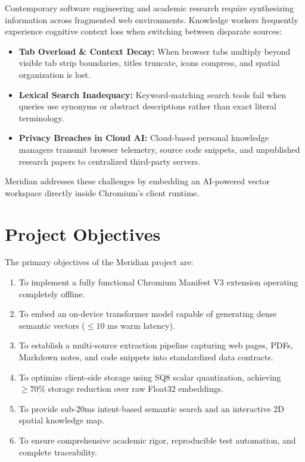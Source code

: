 \documentclass{tietreport}
\begin{document}
Contemporary software engineering and academic research require synthesizing information across fragmented web environments. Knowledge workers frequently experience cognitive context loss when switching between disparate sources:
\begin{itemize}
    \item \textbf{Tab Overload \& Context Decay:} When browser tabs multiply beyond visible tab strip boundaries, titles truncate, icons compress, and spatial organization is lost.
    \item \textbf{Lexical Search Inadequacy:} Keyword-matching search tools fail when queries use synonyms or abstract descriptions rather than exact literal terminology.
    \item \textbf{Privacy Breaches in Cloud AI:} Cloud-based personal knowledge managers transmit browser telemetry, source code snippets, and unpublished research papers to centralized third-party servers.
\end{itemize}

Meridian addresses these challenges by embedding an AI-powered vector workspace directly inside Chromium's client runtime.

\section{Project Objectives}

The primary objectives of the Meridian project are:
\begin{enumerate}
    \item To implement a fully functional Chromium Manifest V3 extension operating completely offline.
    \item To embed an on-device transformer model capable of generating dense semantic vectors ($\le 10\text{ ms}$ warm latency).
    \item To establish a multi-source extraction pipeline capturing web pages, PDFs, Markdown notes, and code snippets into standardized data contracts.
    \item To optimize client-side storage using SQ8 scalar quantization, achieving $\ge 70\%$ storage reduction over raw Float32 embeddings.
    \item To provide sub-20ms intent-based semantic search and an interactive 2D spatial knowledge map.
    \item To ensure comprehensive academic rigor, reproducible test automation, and complete traceability.
\end{enumerate}
\end{document}
